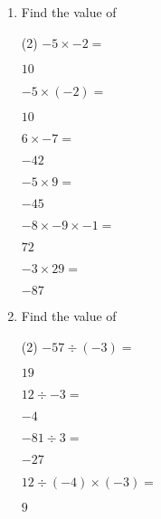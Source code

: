 \begin{enumerate} [leftmargin=0cm]
\item Find the value of
\begin{tasks}[label=(\alph*), after-item-skip=2pt,after-skip=3pt, label-width=4ex](2)
    \task  $ -5 \times -2 =                 $                           \begin{envFillIn}$  10      $ \end{envFillIn}
    \task  $ -5 \times (-2) =               $                           \begin{envFillIn}$  10      $    \end{envFillIn}
    \task  $  6 \times -7 =                 $                           \begin{envFillIn}$  -42     $    \end{envFillIn}
    \task  $ -5 \times 9 =                  $                           \begin{envFillIn}$  -45     $    \end{envFillIn}
    \task  $ -8 \times -9 \times -1 =       $                           \begin{envFillIn}$  72      $    \end{envFillIn}
    \task  $ -3 \times 29 =                 $                           \begin{envFillIn}$  -87     $    \end{envFillIn}
\end{tasks}

\item Find the value of
\begin{tasks}[label=(\alph*), after-item-skip=2pt,after-skip=3pt, label-width=4ex](2)
    \task  $ -57 \div  (-3) =               $                           \begin{envFillIn}$  19      $    \end{envFillIn}
    \task  $ 12 \div  -3 =                  $                           \begin{envFillIn}$  -4      $    \end{envFillIn}
    \task  $ -81 \div  3 =                  $                           \begin{envFillIn}$  -27     $    \end{envFillIn}
    \task  $ 12 \div (-4) \times (-3)=      $                           \begin{envFillIn}$  9       $    \end{envFillIn}
\end{tasks}


\end{enumerate}
